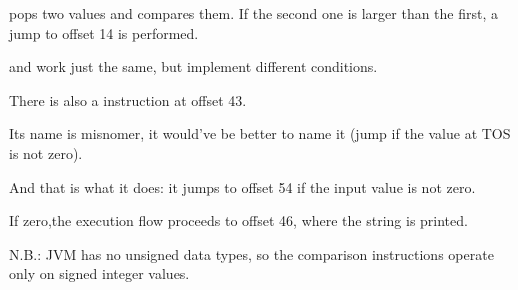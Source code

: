  pops two values and compares them.
If the second one is larger than the first, a jump to offset 14 is performed.

 and  work just the same, but implement different conditions.


There is also a  instruction at offset 43.

Its name is misnomer, it would've be better to name it  
(jump if the value at \ac{TOS} is not zero).

And that is what it does: it jumps to offset 54 if the input value is not zero.

If zero,the  execution flow proceeds to offset 46, where the  string is printed.


N.B.: \ac{JVM} has no unsigned data types, so the comparison instructions operate 
only on signed integer values.

